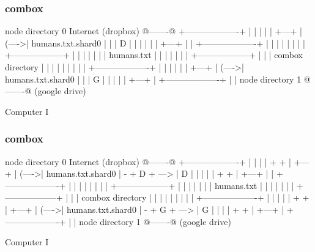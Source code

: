\begin{frame}[fragile]
  \frametitle{combox}

  {\tiny
  \begin{semiverbatim}

         node directory 0                Internet
         (dropbox)                       @-------@
        +-------------------+            |       |
        |                   |            | +---+ |
  (---->| humans.txt.shard0 |            | | D | |
  |     |                   |            | +---+ |
  |     +-------------------+            |       |
  |                                      |       |
  |                                      |       |
 +------------------+                    |       |
 |                  |                    |       |
 |  humans.txt      |                    |       |
 |                  |                    |       |
 +------------------+                    |       |
  |  combox directory                    |       |
  |                                      |       |
  |                                      |       |
  |     +-------------------+            |       |
  |     |                   |            | +---+ |
  (---->| humans.txt.shard0 |            | | G | |
        |                   |            | +---+ |
        +-------------------+            |       |
         node directory 1                @-------@
         (google drive)

  Computer I
  \end{semiverbatim}
  }

\end{frame}

\begin{frame}[fragile]
  \frametitle{combox}

  {\tiny
  \begin{semiverbatim}

         node directory 0                Internet
         (dropbox)                       @-------@
        +-------------------+            |       |
        |                   |    + +     | +---+ |
  (---->| humans.txt.shard0 | - + D + ---> | D | |
  |     |                   |    + +     | +---+ |
  |     +-------------------+            |       |
  |                                      |       |
  |                                      |       |
 +------------------+                    |       |
 |                  |                    |       |
 |  humans.txt      |                    |       |
 |                  |                    |       |
 +------------------+                    |       |
  |  combox directory                    |       |
  |                                      |       |
  |                                      |       |
  |     +-------------------+            |       |
  |     |                   |    + +     | +---+ |
  (---->| humans.txt.shard0 | - + G + ---> | G | |
        |                   |    + +     | +---+ |
        +-------------------+            |       |
         node directory 1                @-------@
         (google drive)

  Computer I
  \end{semiverbatim}
  }

\end{frame}



